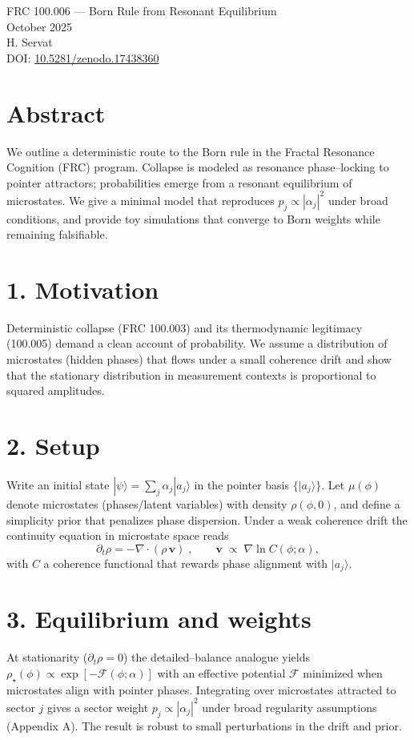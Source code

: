 \documentclass[10pt]{article}
\begin{document}
\begin{center}
{\Large FRC 100.006 — Born Rule from Resonant Equilibrium}\\
{\large October 2025}\\[4pt]
H. Servat
\\[4pt]
\small DOI: \href{https://doi.org/10.5281/zenodo.17438360}{10.5281/zenodo.17438360}
\end{center}

\section*{Abstract}
We outline a deterministic route to the Born rule in the Fractal Resonance Cognition (FRC) program. Collapse is modeled as resonance phase--locking to pointer attractors; probabilities emerge from a resonant equilibrium of microstates. We give a minimal model that reproduces $p_j\!\propto\!|\alpha_j|^2$ under broad conditions, and provide toy simulations that converge to Born weights while remaining falsifiable.

\section*{1. Motivation}
Deterministic collapse (FRC 100.003) and its thermodynamic legitimacy (100.005) demand a clean account of probability. We assume a distribution of microstates (hidden phases) that flows under a small coherence drift and show that the stationary distribution in measurement contexts is proportional to squared amplitudes.

\section*{2. Setup}
Write an initial state $|\psi\rangle=\sum_j \alpha_j |a_j\rangle$ in the pointer basis $\{|a_j\rangle\}$. Let $\mu(\phi)$ denote microstates (phases/latent variables) with density $\rho(\phi,0)$, and define a simplicity prior that penalizes phase dispersion. Under a weak coherence drift the continuity equation in microstate space reads
\begin{equation}
 \partial_t \rho = -\nabla\!\cdot (\rho\,\mathbf{v})\; ,\qquad \mathbf{v} \;\propto\; \nabla \ln C(\phi;\alpha),
\end{equation}
with $C$ a coherence functional that rewards phase alignment with $|a_j\rangle$.

\section*{3. Equilibrium and weights}
At stationarity ($\partial_t\rho=0$) the detailed--balance analogue yields $\rho_\star(\phi)\propto \exp[-\mathcal{F}(\phi;\alpha)]$ with an effective potential $\mathcal{F}$ minimized when microstates align with pointer phases. Integrating over microstates attracted to sector $j$ gives a sector weight $p_j\!\propto\!|\alpha_j|^2$ under broad regularity assumptions (Appendix A). The result is robust to small perturbations in the drift and prior.
\end{document}
